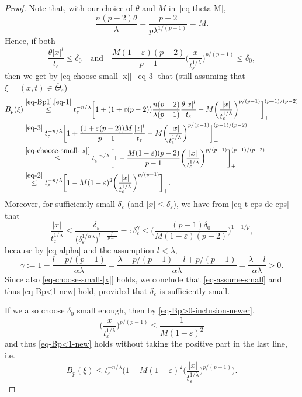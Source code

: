 \documentclass[10pt,a4paper]{amsart}
\newcommand{\al}{\alpha}
\newcommand{\de}{\delta}
\newcommand{\eps}{\varepsilon}
\newcommand{\ga}{\gamma}
\newcommand{\la}{\lambda}
\newcommand{\os}[2]{\overset{#1}{#2}}
\begin{document}
\begin{proof}
Note that, with our choice of $\theta$ and $M$  in~\eqref{eq-theta-M},
\begin{equation} \label{eq-3}
\frac{n(p-2)\theta}{\la } = \frac{p-2}{p \la^{1/(p-1)} } = M.
\end{equation}
Hence, if both
\begin{equation}    \label{eq-assume-small}
\frac{\theta |x|^l}{t_\eps} \le \de_0
\quad \text{and} \quad
\frac{M(1-\eps)(p-2)}{p-1}  \biggl( \frac{|x|}{t_\eps^{1/\la}} \biggr)^{p/(p-1)} \le \de_0,
\end{equation}
then we get by 
\eqref{eq-choose-small-|x|}--\eqref{eq-3}
that (still assuming that $\xi=(x,t)\in \overline{\Theta}_\eps$)
\begin{align}
B_p(\xi) 
&\os{\eqref{eq-Bp1},\eqref{eq-1}}{\le}  t_\eps^{-n/\la}  \biggl[ 1 + (1+\eps(p-2))
     \frac {n(p-2)}{\la (p-1)} \frac{\theta|x|^l}{t_\eps} - M
\biggl( \frac{|x|}{t_\eps^{1/\la}} \biggr)^{p/(p-1)} \biggr]_{+}^{(p-1)/(p-2)} \nonumber \\
&\os{\eqref{eq-3}}{=}  t_\eps^{-n/\la}  \biggl[ 1 +        \frac{(1+\eps(p-2))M}{p-1} \frac{|x|^l}{t_\eps} - M
               \biggl( \frac{|x|}{t_\eps^{1/\la}} \biggr)^{p/(p-1)} \biggr]_{+}^{(p-1)/(p-2)} \nonumber \\
&\os{\eqref{eq-choose-small-|x|}}{\le} t_\eps^{-n/\la}  \biggl[ 1 - \frac{M(1-\eps)(p-2)}{p-1}
\biggl( \frac{|x|}{t_\eps^{1/\la}} \biggr)^{p/(p-1)} \biggr]_{+}^{(p-1)/(p-2)} \nonumber \\  
&\os{\eqref{eq-2}}{\le} t_\eps^{-n/\la}  \biggl[ 1 - M(1-\eps)^2
\biggl( \frac{|x|}{t_\eps^{1/\la}} \biggr)^{p/(p-1)} \biggr]_{+}. 
\label{eq-Bp<1-new}
\end{align}
Moreover, for sufficiently small $\de_\eps$ (and $|x|\le \de_\eps$),   
we have from \eqref{eq-t-eps-de-eps} that
\begin{equation} \label{eq-Bp>0-inclusion-newer}
\frac{|x|}{t_\eps^{1/\la}} \le
\frac{\de_\eps}{ \bigl(\de_\eps^{1/\al\la} \bigr)^{l-\frac{p}{p-1}} }  
=: \de_\eps^\ga
\le \biggl(  \frac{(p-1)\de_0}{M(1-\eps)(p-2)}  \biggr)^{1-1/p},
\end{equation}
because by \eqref{eq-alpha} and the assumption $l < \la$,
\[
\ga := 1-  \frac{l-p/(p-1)}{\al \la} 
= \frac{\la - p/(p-1) - l +p/(p-1)}{\al \la}
= \frac{\la - l}{\al \la}
> 0.
\]
Since also \eqref{eq-choose-small-|x|} holds, we conclude that
\eqref{eq-assume-small} and thus
\eqref{eq-Bp<1-new} hold, provided that 
$\de_\eps $ is sufficiently small.

If we also choose $\de_0$ small  enough, then  by
\eqref{eq-Bp>0-inclusion-newer},
\begin{equation*} %
\biggl(\frac{|x|}{t_\eps^{1/\la}}\biggr)^{p/(p-1)}
\le  \frac{1}{M(1-\eps)^2} 
\end{equation*}
and thus \eqref{eq-Bp<1-new} holds without taking
the positive part in the last line, i.e.
\begin{equation}
B_p(\xi) 
\le t_\eps^{-n/\la}  \biggl( 1 - M(1-\eps)^2
\biggl( \frac{|x|}{t_\eps^{1/\la}} \biggr)^{p/(p-1)} \biggr). 
\label{eq-Bp<1-newer}
\end{equation}



\end{proof}
\end{document}
